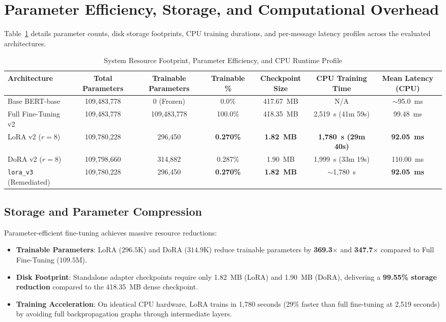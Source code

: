 \documentclass[conference]{IEEEtran}
\begin{document}
\section{Parameter Efficiency, Storage, and Computational Overhead}
\label{sec:efficiency}

Table~\ref{tab:efficiency_profile} details parameter counts, disk storage footprints, CPU training durations, and per-message latency profiles across the evaluated architectures.

\begin{table}[t]
\caption{System Resource Footprint, Parameter Efficiency, and CPU Runtime Profile}
\label{tab:efficiency_profile}
\centering
\small
\begin{tabularx}{\textwidth}{lcccccc}
\toprule
\textbf{Architecture} & \textbf{Total Parameters} & \textbf{Trainable Parameters} & \textbf{Trainable \%} & \textbf{Checkpoint Size} & \textbf{CPU Training Time} & \textbf{Mean Latency (CPU)} \\
\midrule
Base BERT-base & 109,483,778 & 0 (Frozen) & 0.0\% & 417.67~MB & N/A & $\sim$95.0~ms \\
Full Fine-Tuning v2 & 109,483,778 & 109,483,778 & 100.0\% & 418.35~MB & 2,519~s (41m 59s) & 99.48~ms \\
LoRA v2 ($r=8$) & 109,780,228 & 296,450 & \textbf{0.270\%} & \textbf{1.82~MB} & \textbf{1,780~s (29m 40s)} & \textbf{92.05~ms} \\
DoRA v2 ($r=8$) & 109,798,660 & 314,882 & 0.287\% & 1.90~MB & 1,999~s (33m 19s) & 110.00~ms \\
\midrule
\texttt{lora\_v3} (Remediated) & 109,780,228 & 296,450 & \textbf{0.270\%} & \textbf{1.82~MB} & $\sim$1,780~s & \textbf{92.05~ms} \\
\bottomrule
\end{tabularx}
\end{table}

\subsection{Storage and Parameter Compression}
Parameter-efficient fine-tuning achieves massive resource reductions:
\begin{itemize}
    \item \textbf{Trainable Parameters}: LoRA ($296.5\text{K}$) and DoRA ($314.9\text{K}$) reduce trainable parameters by \textbf{369.3$\times$} and \textbf{347.7$\times$} compared to Full Fine-Tuning ($109.5\text{M}$).
    \item \textbf{Disk Footprint}: Standalone adapter checkpoints require only 1.82~MB (LoRA) and 1.90~MB (DoRA), delivering a \textbf{99.55\% storage reduction} compared to the 418.35~MB dense checkpoint.
    \item \textbf{Training Acceleration}: On identical CPU hardware, LoRA trains in 1,780 seconds (29\% faster than full fine-tuning at 2,519 seconds) by avoiding full backpropagation graphs through intermediate layers.
\end{itemize}
\end{document}
